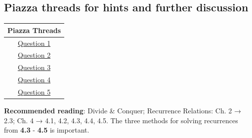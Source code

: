 \documentclass[12pt]{article}
\begin{document}
\hrulefill
\pagebreak

\subsection*{Piazza threads for hints and further discussion}
\begin{center}
    \begin{tabular}{|c|}
    \hline
    Piazza Threads \\ [0.5ex] 
    \hline \hline 
    \href{https://piazza.com/class/ka2roz7rb9m3j4?cid=29}{Question 1}\\
    \href{https://piazza.com/class/ka2roz7rb9m3j4?cid=30}{Question 2}\\
    \href{https://piazza.com/class/ka2roz7rb9m3j4?cid=31}{Question 3}\\
    \href{https://piazza.com/class/ka2roz7rb9m3j4?cid=32}{Question 4}\\
    \href{https://piazza.com/class/ka2roz7rb9m3j4?cid=33}{Question 5}\\
    
    \hline
    \end{tabular}
\end{center}

\textbf{Recommended reading}: Divide \& Conquer; Recurrence Relations: Ch. 2 →  2.3; Ch. 4 →  4.1, 4.2, 4.3, 4.4, 4.5. The three methods for solving recurrences from \textbf{4.3} - \textbf{4.5} is important. 

\pagebreak
\end{document}
